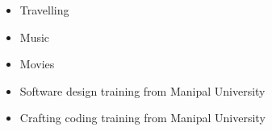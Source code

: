 \divider

\divider



\begin{itemize}
    
    \item Travelling
    \item Music
    \item Movies
\end{itemize}

\begin{itemize}
    \item Software design training from Manipal University
    \item Crafting coding training from Manipal University
  
\end{itemize}
